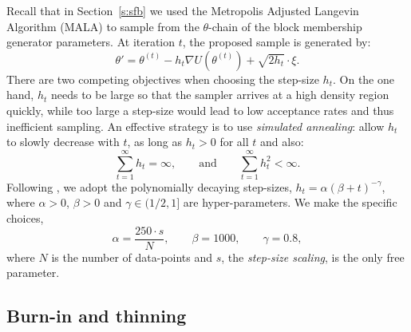 Recall that in 
Section~\ref{s:sfb} we used 
the Metropolis Adjusted Langevin Algorithm (MALA)
to 
sample from the $\theta$-chain of the block membership 
generator parameters.
At iteration $t$, the proposed sample is generated by:
%
\begin{equation}
	\theta' = \theta^{(t)} - h_t \nabla U(\theta^{(t)}) + \sqrt{2h_t} \cdot \xi.
\end{equation}
%
There are two competing objectives when choosing the step-size $h_t$. 
On the one hand, $h_t$ needs to be large so that the sampler
arrives at a high density region quickly,
while too large a step-size would lead to low acceptance rates and thus 
inefficient sampling. An effective strategy is
to use {\em simulated annealing}: allow $h_t$ to slowly decrease
with $t$, as long as $h_t>0$ for all $t$ and also:
%
\begin{equation}
	\sum_{t=1}^{\infty} h_t = \infty, \qquad \textrm{and} \qquad
	\sum_{t=1}^{\infty} h_t^2 < \infty.
	\label{eqn:h-constraints}
\end{equation}
%
Following \citet{Bayesian-SGLD}, we adopt the 
polynomially decaying step-sizes,
%
$h_t = \alpha(\beta + t)^{-\gamma}$,
%
where $\alpha>0$, $\beta>0$ and $\gamma\in(1/2,1]$ are hyper-parameters.
We make the specific choices,
%
\begin{equation}
	\alpha = \frac{250 \cdot s}{N}, \qquad \beta = 1000, \qquad \gamma = 0.8,
	\label{eqn:step-size-params}
\end{equation}
%
where $N$ is the number of data-points and $s$,
the {\em step-size scaling}, is the only free parameter.


\subsection{Burn-in and thinning}
\label{appdx:burn-in-thinning}


